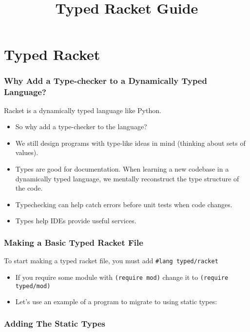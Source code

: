 \documentclass{beamer}
\title{Typed Racket Guide}
\begin{document}
\begin{frame}
\titlepage
\end{frame}
\section{Typed Racket}

\begin{frame}
  \frametitle{Why Add a Type-checker to a Dynamically Typed Language?}
  Racket is a dynamically typed language like Python.
  \begin{itemize}
  \item<2-> So why add a type-checker to the language?
  \item<3-> We still design programs with type-like ideas in mind (thinking about sets of values).
  \item<4-> Types are good for documentation. When learning a new codebase
    in a dynamically typed language, we mentally reconstruct the type structure
    of the code.
  \item<5-> Typechecking can help catch errors before unit tests when code changes.
  \item<6-> Types help IDEs provide useful services.
  \end{itemize}
\end{frame}



\begin{frame}
  \frametitle{Making a Basic Typed Racket File}
  To start making a typed racket file, you  must add \texttt{\#lang typed/racket}
  \begin{itemize}
  \item<2-> If you require some module with \texttt{(require mod)} change it to
    \texttt{(require typed/mod)}
  \item<3-> Let's use an example of a program to migrate to using static types:
  \end{itemize}
\end{frame}

\begin{frame}
  \frametitle{Adding The Static Types}
  
\end{frame}
\end{document}
